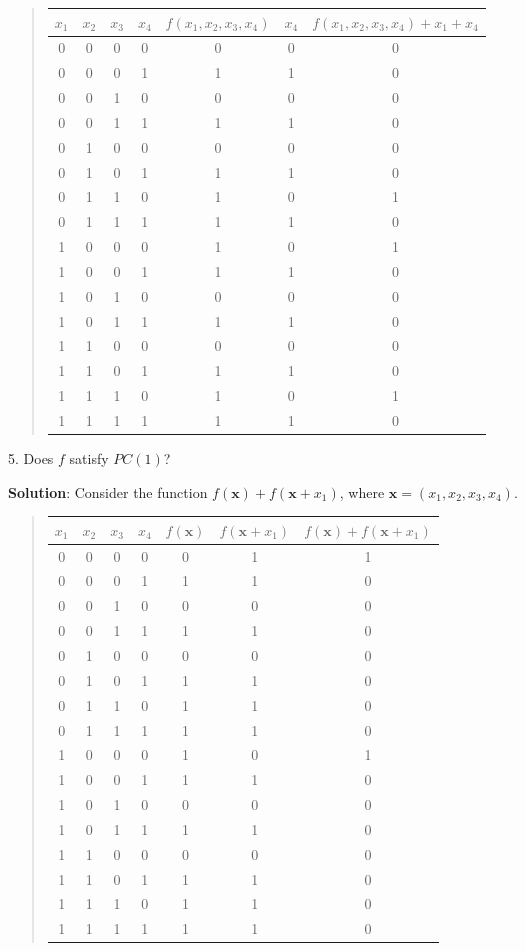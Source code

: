 \documentclass[12pt]{article}
\theoremstyle{plain}
\begin{document}
\begin{quote}
\begin{tabular}{c c c c| c || c || c }
$x_1$ & $x_2$ & $x_3$ & $x_4$ & $f(x_1, x_2, x_3, x_4)$ & $x_4$ & $f(x_1, x_2, x_3, x_4)+x_1+x_4$ \\
\hline
0 & 0 & 0 & 0 & 0 & 0 &	0\\
0 & 0 & 0 & 1 & 1 & 1 &	0\\
0 & 0 & 1 & 0 & 0 & 0 & 0\\
0 & 0 & 1 & 1 & 1 & 1	&	0\\
0 & 1 & 0 & 0 & 0 & 0	&	0\\
0 & 1 & 0 & 1 & 1 & 1	&	0\\
0 & 1 & 1 & 0 & 1 & 0	& 1\\
0 & 1 & 1 & 1 & 1 & 1	&	0\\
1 & 0 & 0 & 0 & 1 & 0	&	1\\
1 & 0 & 0 & 1 & 1 & 1	&	0\\
1 & 0 & 1 & 0 & 0 & 0	&	0\\
1 & 0 & 1 & 1 & 1 & 1	&	0\\
1 & 1 & 0 & 0 & 0 & 0	&	0\\
1 & 1 & 0 & 1 & 1 & 1	&	0\\
1 & 1 & 1 & 0 & 1 & 0	&	1\\
1 & 1 & 1 & 1 & 1 & 1	&	0\\
\end{tabular}
\end{quote}

5. Does $f$ satisfy $PC(1)$?

{\bf Solution}: Consider the function $f(\mathbf{x})+f(\mathbf{x}+x_1)$, where $\mathbf{x} = (x_1, x_2, x_3, x_4)$.

\begin{quote}
\begin{tabular}{c c c c| c || c || c }
$x_1$ & $x_2$ & $x_3$ & $x_4$ & $f(\mathbf{x})$ & $f(\mathbf{x}+x_1)$ & $f(\mathbf{x})+f(\mathbf{x}+x_1)$ \\
\hline
0 & 0 & 0 & 0 & 0 & 1 &	1\\
0 & 0 & 0 & 1 & 1 & 1 &	0\\
0 & 0 & 1 & 0 & 0 & 0 & 0\\
0 & 0 & 1 & 1 & 1 & 1	&	0\\
0 & 1 & 0 & 0 & 0 & 0	&	0\\
0 & 1 & 0 & 1 & 1 & 1	&	0\\
0 & 1 & 1 & 0 & 1 & 1	& 0\\
0 & 1 & 1 & 1 & 1 & 1	&	0\\
1 & 0 & 0 & 0 & 1 & 0	&	1\\
1 & 0 & 0 & 1 & 1 & 1	&	0\\
1 & 0 & 1 & 0 & 0 & 0	&	0\\
1 & 0 & 1 & 1 & 1 & 1	&	0\\
1 & 1 & 0 & 0 & 0 & 0	&	0\\
1 & 1 & 0 & 1 & 1 & 1	&	0\\
1 & 1 & 1 & 0 & 1 & 1	&	0\\
1 & 1 & 1 & 1 & 1 & 1	&	0\\
\end{tabular}
\end{quote}
\end{document}
